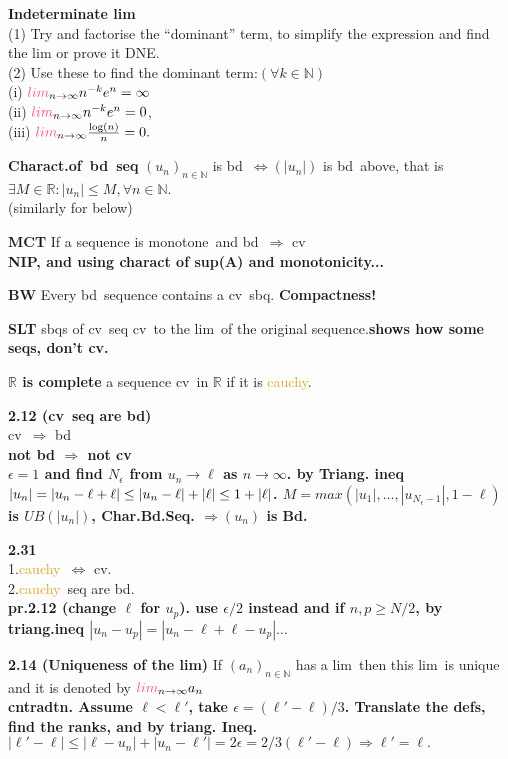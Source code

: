 \documentclass[10pt,landscape,a4paper]{article}
\def\line{

  \noindent{\color{mygray} \rule{\linewidth}{0.005mm}}

}
\def\R{\mathbb{R}}
\def\N{\mathbb{N}}
\def \bd{\textcolor{burgundy}{bd}}
\def\monotone{\textcolor{burntorange}{monotone}}
\def\cv{\textcolor{emerald}{cv}}
\def\cauchy{\textcolor{goldenrod}{cauchy}}
\def\lim{\textcolor{frenchrose}{lim}}
\newcommand\thm[1]{\line\textcolor{darklavender}{\bf#1}}
\newcommand\hint[1]{\textcolor{trolleygrey}{\bf#1}}
\newcommand\greenbox[1]{\line\textcolor{ferngreen}{\bf#1}}
\newcommand\LIMinfty{\lim_{n\to\infty}}
\begin{document}
\begin{multicols}{8}
\greenbox{Indeterminate \lim\ }\\
(1) Try and factorise the “dominant” term, to simplify the expression and find
the lim or prove it DNE.\\
(2) Use these to find the dominant term:$(\forall k \in \N)$\\
(i) $\LIMinfty n^{-k} e^n = \infty$\\
(ii) $\LIMinfty n^{-k} e^n = 0$,\\
(iii) $\LIMinfty \frac{\log(n)}{n} = 0.$

\thm{Charact.of\ \bd\ seq} $(u_n)_{n \in \N}$ is  \bd\ $\Leftrightarrow (|u_n |)$ is  \bd\ above, that is\\ $\exists M \in \R : |u_n| \leq M, \forall n \in \N$. \\(similarly for below)

\thm{MCT}
 If a sequence is \monotone\ and  \bd\ $\Rightarrow$ \cv\.\\\hint{*NIP, and using charact of sup(A) and monotonicity...}

\thm{BW} Every  \bd\ sequence contains a \cv\ sbq.
\hint{Compactness!}

\thm{SLT} sbqs of \cv\ seq \cv\ to the \lim\ of the original sequence.\hint{shows how some seqs, don't \cv.}

\thm{$\R$  is complete} a sequence \cv\ in $\R$ if it is \cauchy. 

\thm{2.12 (\cv\ seq are \bd)} \\
\cv\ $\Rightarrow$  \bd\ \\\hint{not \bd 
$\Rightarrow$ not \cv}
\\\hint{$\epsilon = 1$ and find $N_\epsilon$ from $u_n \to \ell$ as $n \to \infty$.
by Triang. ineq \\$|u_n| = |u_n - \ell + \ell| \leq\\ |u_n - \ell| + |\ell| \leq 1 + |\ell|$. $M = max(|u_1|,\hdots,|u_{N_{\epsilon}-1}|,1-\ell)$ is $UB(|u_n|)$, Char.Bd.Seq. $\Rightarrow (u_n)$ is Bd.}

\thm{2.31} \\1.\cauchy\ $\Leftrightarrow$ \cv.
 \\2.\cauchy\ seq are  \bd. \\\hint{*pr.2.12 (change $\ell$ for $u_p$). use $\epsilon/2$ instead and if $n, p \geq N/2$, by triang.ineq $|u_n - u_p| = |u_n - \ell + \ell - u_p| \hdots$} 
 
\thm{2.14 (Uniqueness of the lim)}
If $(a_n)_{n \in \N}$ has a \lim\, then this \lim\ is unique and it is denoted by $\LIMinfty a_n$
\\\hint{cntradtn. Assume $\ell < \ell'$, take $\epsilon = (\ell' - \ell)/3$. Translate the defs, find the ranks, and by triang. Ineq.\\$|\ell'-\ell|\leq|\ell- u_n| +|u_n - \ell'| = 2 \epsilon = 2/3 (\ell' - \ell) \Rightarrow \ell' = \ell.$}


\end{multicols}
\end{document}
